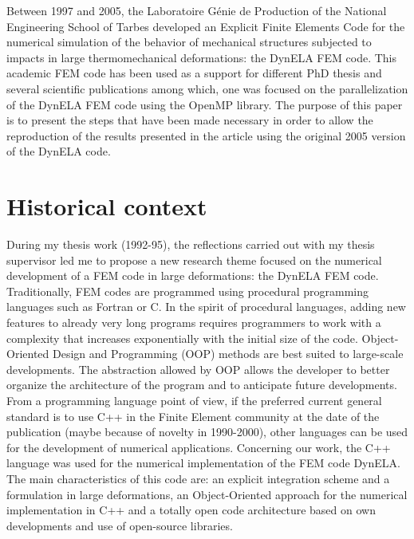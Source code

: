 


Between 1997 and 2005, the Laboratoire G\'enie de Production of the National Engineering School of Tarbes developed an Explicit Finite Elements Code for the numerical simulation of the behavior of mechanical structures subjected to impacts in large thermomechanical deformations: the DynELA FEM code. This academic FEM code has been used as a support for different PhD thesis and several scientific publications \cite{Pantale:2002,Pantale:2004,Menanteau:2006,Nistor:2007,Nistor:2008} among which, one \cite{Pantale:2005} was focused on the parallelization of the DynELA FEM code using the OpenMP library. The purpose of this paper is to present the steps that have been made necessary in order to allow the reproduction of the results presented in the article \cite{Pantale:2005} using the original 2005 version of the DynELA code.

\section{Historical context}

During my thesis work (1992-95), the reflections carried out with my thesis supervisor led me to propose a new research theme focused on the numerical development of a FEM code in large deformations: the DynELA FEM code. Traditionally, FEM codes are programmed using procedural programming languages such as Fortran or C. In the spirit of procedural languages, adding new features to already very long programs requires programmers to work with a complexity that increases exponentially with the initial size of the code. Object-Oriented Design and Programming (OOP) methods are best suited to large-scale developments. The abstraction allowed by OOP allows the developer to better organize the architecture of the program and to anticipate future developments. From a programming language point of view, if the preferred current general standard is to use C++ in the Finite Element community at the date of the publication (maybe because of novelty in 1990-2000), other languages can be used for the development of numerical applications. Concerning our work, the C++ language was used for the numerical implementation of the FEM code DynELA. The main characteristics of this code are: an explicit integration scheme and a formulation in large deformations, an Object-Oriented approach for the numerical implementation in C++ and a totally open code architecture based on own developments and use of open-source libraries.

